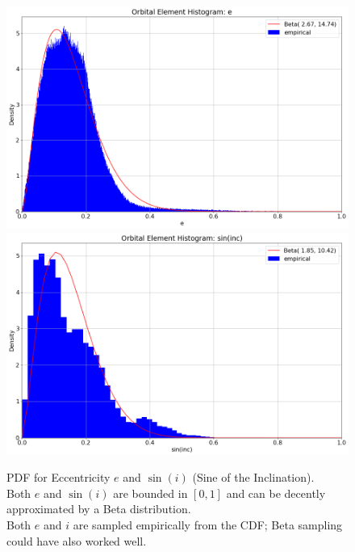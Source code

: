 \begin{figure}[hbt!]
\begin{center}
\includegraphics[width=1.0\textwidth]{../figs/elts/elt_hist_e.png}
\includegraphics[width=1.0\textwidth]{../figs/elts/elt_hist_i.png}
\end{center}
\caption[PDF for Eccentricity $e$ and $\sin(i)$ (Sine of the Inclination).]
{PDF for Eccentricity $e$ and $\sin(i)$ (Sine of the Inclination).\\
Both $e$ and $\sin(i)$ are bounded in $[0, 1]$ and can be decently approximated by a Beta distribution.\\
Both $e$ and $i$ are sampled empirically from the CDF; Beta sampling could have also worked well.}
\label{fig:elt_dist_e_i}
\end{figure}
\clearpage

